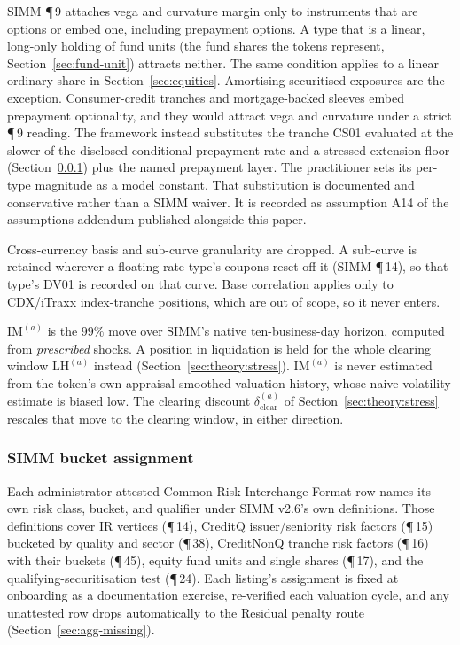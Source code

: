 SIMM \P\,9 attaches vega and curvature margin only to instruments that are options or embed
one, including prepayment options. A type that is a linear, long-only holding of fund units
(the fund shares the tokens represent, Section~\ref{sec:fund-unit}) attracts neither. The same condition applies to a linear ordinary share in Section~\ref{sec:equities}.
Amortising securitised exposures are the exception. Consumer-credit tranches and
mortgage-backed sleeves embed prepayment optionality, and they would attract vega and
curvature under a strict \P\,9 reading. The framework instead substitutes the tranche CS01 evaluated at the slower of the disclosed
conditional prepayment rate and a stressed-extension floor
(Section~\ref{sec:tax-simm-assignment}) plus the named prepayment layer. The practitioner sets its
per-type magnitude as a model constant. That
substitution is documented and conservative rather than a SIMM waiver. It is recorded as
assumption A14 of the assumptions addendum published alongside this paper.

Cross-currency basis and sub-curve granularity are dropped. A sub-curve is retained wherever
a floating-rate type's coupons reset off it (SIMM \P\,14), so that type's DV01 is recorded on
that curve. Base correlation applies only to CDX/iTraxx index-tranche positions, which are
out of scope, so it never enters.

$\mathrm{IM}^{(a)}$ is the $99\%$ move over SIMM's native ten-business-day horizon, computed
from \emph{prescribed} shocks. A position in liquidation is held for the whole clearing window
$\mathrm{LH}^{(a)}$ instead (Section~\ref{sec:theory:stress}). $\mathrm{IM}^{(a)}$ is never
estimated from the token's own appraisal-smoothed valuation history, whose naive volatility
estimate is biased low. The clearing discount $\delta_{\mathrm{clear}}^{(a)}$ of
Section~\ref{sec:theory:stress} rescales that move to the clearing window, in either
direction.

\subsubsection{SIMM bucket assignment}\label{sec:tax-simm-assignment}
Each administrator-attested Common Risk Interchange Format row names its own risk class, bucket, and qualifier under
SIMM v2.6's own definitions. Those definitions cover IR vertices (\P\,14), CreditQ
issuer/seniority risk factors (\P\,15) bucketed by quality and sector (\P\,38), CreditNonQ
tranche risk factors (\P\,16) with their buckets (\P\,45), equity fund units and single shares (\P\,17), and the
qualifying-securitisation test (\P\,24). Each listing's assignment is fixed at onboarding as a
documentation exercise, re-verified each valuation cycle, and any unattested row drops
automatically to the Residual penalty route (Section~\ref{sec:agg-missing}).

